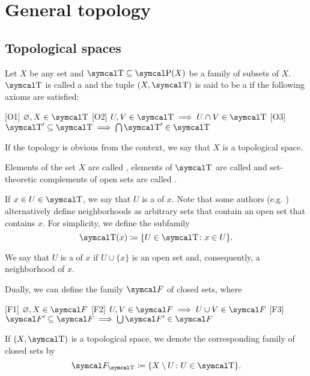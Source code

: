\section{General topology}\label{sec:general_topology}
\subsection{Topological spaces}\label{subsec:topological_spaces}

\begin{definition}\label{def:topological_space}\cite[11]{Engelking1989}
  Let \( X \) be any set and \( \CT \subseteq \Power(X) \) be a family of subsets of \( X \). \( \CT \) is called a  and the tuple \( (X, \CT) \) is said to be a  if the following axioms are satisfied:
  \begin{description}
    [O1] \( \varnothing, X \in \CT \)
    [O2] \( U, V \in \CT \implies U \cap V \in \CT \)
    [O3] \( \CT' \subseteq \CT \implies \bigcap \CT' \in \CT \)
  \end{description}

  If the topology is obvious from the context, we say that \( X \) is a topological space.

  Elements of the set \( X \) are called , elements of \( \CT \) are called  and set-theoretic complements of open sets are called .

  If \( x \in U \in \CT \), we say that \( U \) is a  of \( x \). Note that some authors (e.g. \cite[38]{Kelley1955}) alternatively define neighborhoods as arbitrary sets that contain an open set that contains \( x \). For simplicity, we define the subfamily
  \begin{equation*}
    \CT(x) \coloneqq \{ U \in \CT \colon x \in U \}.
  \end{equation*}

  We say that \( U \) is a  of \( x \) if \( U \cup \{ x \} \) is an open set and, consequently, a neighborhood of \( x \).

  Dually, we can define the family \( \Cal{F} \) of closed sets, where
  \begin{description}
    [F1] \( \varnothing, X \in \Cal{F} \)
    [F2] \( U, V \in \Cal{F} \implies U \cup V \in \Cal{F} \)
    [F3] \( \Cal{F}' \subseteq \Cal{F} \implies \bigcup \Cal{F}' \in \Cal{F} \)
  \end{description}

  If \( (X, \CT) \) is a topological space, we denote the corresponding family of closed sets by
  \begin{equation*}
    \Cal{F}_{\CT} \coloneqq \{ X \setminus U \colon U \in \CT \}.
  \end{equation*}
\end{definition}

